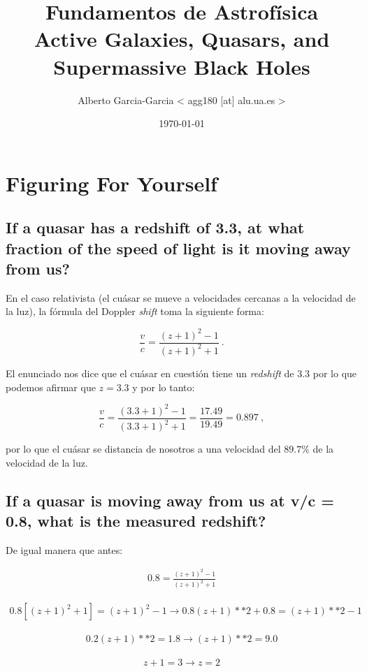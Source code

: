 \documentclass{tufte-handout}
\title{Fundamentos de Astrofísica\\ Active Galaxies, Quasars, and Supermassive Black Holes }
\author[Alberto Garcia-Garcia]{Alberto Garcia-Garcia < agg180 [at] alu.ua.es >}
\date{\today}  %
\begin{document}
\maketitle%

\section{Figuring For Yourself}

\subsection{\textbf{If a quasar has a redshift of 3.3, at what fraction of the speed of light is it moving away from us?}}

En el caso relativista (el cuásar se mueve a velocidades cercanas a la velocidad de la luz), la fórmula del Doppler \emph{shift} toma la siguiente forma:

\begin{equation}
\frac{v}{c} = \frac{(z + 1)^2 - 1}{(z + 1)^2 + 1}~.
\end{equation}

El enunciado nos dice que el cuásar en cuestión tiene un \emph{redshift} de $3.3$ por lo que podemos afirmar que $z = 3.3$ y por lo tanto:

\begin{equation}
\frac{v}{c} = \frac{(3.3 + 1)^2 -1}{(3.3 + 1)^2 + 1} = \frac{17.49}{19.49} = 0.897~,
\end{equation}

por lo que el cuásar se distancia de nosotros a una velocidad del $89.7\%$ de la velocidad de la luz.

\subsection{\textbf{If a quasar is moving away from us at v/c = 0.8, what is the measured redshift?}}

De igual manera que antes:

\begin{align}
0.8 = \frac{(z + 1)^2 - 1}{(z + 1)^2 + 1}
\end{align}

\begin{align}
0.8 [(z + 1)^2 + 1] = (z + 1)^2 - 1 \rightarrow 0.8 (z + 1)**2 + 0.8 = (z + 1)**2 - 1
\end{align}

\begin{align}
0.2 (z + 1)**2 = 1.8 \rightarrow (z + 1)**2 = 9.0
\end{align}

\begin{align}
z + 1 = 3 \rightarrow z = 2
\end{align}



\end{document}
